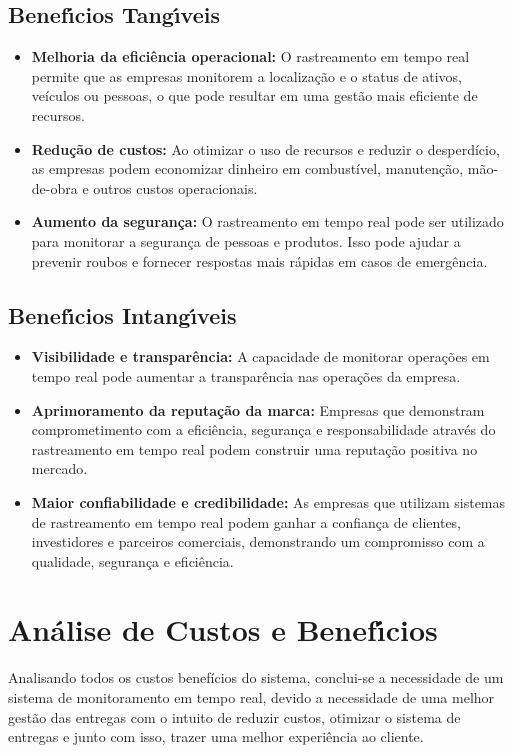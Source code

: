        \subsection{Benef\'{\i}cios Tang\'{\i}veis}
		\begin{itemize}
			\item \textbf{Melhoria da eficiência operacional:} O rastreamento em tempo real permite que as empresas monitorem a localização e o status de ativos, veículos ou pessoas, o que pode resultar em uma gestão mais eficiente de recursos.
			
			\item \textbf{Redução de custos:}  Ao otimizar o uso de recursos e reduzir o desperdício, as empresas podem economizar dinheiro em combustível, manutenção, mão-de-obra e outros custos operacionais.
			
			\item \textbf{Aumento da segurança:} O rastreamento em tempo real pode ser utilizado para monitorar a segurança de pessoas e produtos. Isso pode ajudar a prevenir roubos e fornecer respostas mais rápidas em casos de emergência.
		\end{itemize}

       \subsection{Benef\'{\i}cios Intang\'{\i}veis}
		\begin{itemize}
			\item \textbf{Visibilidade e transparência:} A capacidade de monitorar operações em tempo real pode aumentar a transparência nas operações da empresa.
			
			\item \textbf{Aprimoramento da reputação da marca:} Empresas que demonstram comprometimento com a eficiência, segurança e responsabilidade através do rastreamento em tempo real podem construir uma reputação positiva no mercado.
			
			\item \textbf{Maior confiabilidade e credibilidade:} As empresas que utilizam sistemas de rastreamento em tempo real podem ganhar a confiança de clientes, investidores e parceiros comerciais, demonstrando um compromisso com a qualidade, segurança e eficiência.
		\end{itemize}

\section{An\'{a}lise de Custos e Benef\'{\i}cios}
Analisando todos os custos benefícios do sistema, conclui-se a necessidade de um sistema de monitoramento em tempo real, devido a necessidade de uma melhor gestão das entregas com o intuito de reduzir custos, otimizar o sistema de entregas e junto com isso, trazer uma melhor experiência ao cliente.




